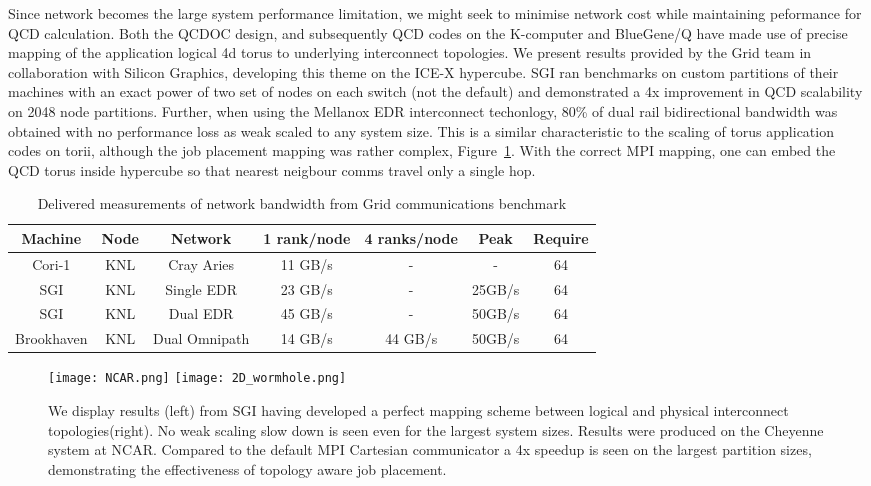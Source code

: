 \documentclass{PoS}
\begin{document}
Since network becomes the large system performance limitation, we might seek to minimise network
cost while maintaining peformance for QCD calculation. Both the QCDOC design\cite{QCDSP}, and subsequently
QCD codes on the K-computer \cite{tofu} and BlueGene/Q\cite{boylebgq} have made use of precise mapping of
the application logical 4d torus to underlying interconnect topologies.
We present results provided by the Grid team in collaboration with Silicon Graphics, developing this theme
on the ICE-X hypercube. SGI ran benchmarks on custom partitions of their machines with an exact power of two
set of nodes on each switch (not the default) and demonstrated a 4x improvement in QCD scalability on 2048 node
partitions. Further, when using the Mellanox EDR interconnect techonlogy, 80\% of dual rail bidirectional
bandwidth was obtained with no performance loss as weak scaled to any system size. This is a similar characteristic
to the scaling of torus application codes on torii, although the job placement mapping was rather complex, Figure~\ref{fig:bgqncar}.
With the correct MPI mapping, one can embed the QCD torus inside hypercube so that nearest neigbour comms travel only a single hop.

\begin{table}[hbt]
\begin{tabular}{|c|c|c|c|c|c|c|}
\hline
Machine & Node & Network      &  1 rank/node & 4 ranks/node & Peak  & Require\\
\hline
Cori-1 & KNL &  Cray Aries  & 11 GB/s    & -        & - & 64\\
SGI    & KNL & Single EDR   & 23 GB/s    & -        & 25GB/s& 64\\
SGI    & KNL &   Dual EDR   & 45 GB/s    & -        & 50GB/s& 64\\
Brookhaven & KNL & Dual Omnipath& 14 GB/s    & 44 GB/s  & 50GB/s& 64\\
\hline
\end{tabular}
\caption{\label{tab:network}
Delivered measurements of network bandwidth from Grid communications benchmark}
\end{table}

\begin{figure}[hbt]
\texttt{[image: NCAR.png]}
\texttt{[image: 2D\_wormhole.png]}
\caption{\label{fig:bgqncar}
We display results (left) from SGI having developed a perfect mapping scheme between logical and physical
interconnect topologies(right). No weak scaling slow down is seen even for the largest system sizes. Results
were produced on the Cheyenne system at NCAR. Compared to the default MPI Cartesian communicator a 4x speedup
is seen on the largest partition sizes, demonstrating the effectiveness of topology aware job placement.}
\end{figure}
\end{document}
